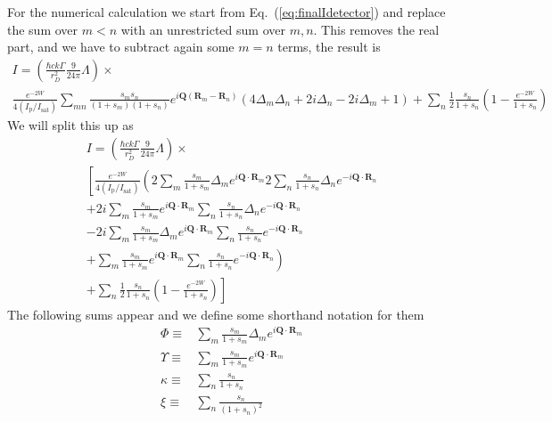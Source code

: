 \documentclass[11pt,letter]{article}
\newcommand{\bv}[1]{\ensuremath{\bm{#1}}}
\newcommand{\iisat}{\ensuremath{I_{\mathrm{p}}/I_{\mathrm{sat}}}}
\begin{document}
For the numerical calculation we start from Eq.~(\ref{eq:finalIdetector}) and replace the sum over $m<n$ with an unrestricted sum over $m,n$.  This removes the real part, and we have to subtract again some $m=n$ terms, the result is 
\begin{multline}
 I  =
 \left( 
 \frac{\hbar c k \Gamma}{r_{D}^{2}}  
     \frac{9}{24\pi} \Lambda 
  \right) \times \\
  \frac{ e^{-2W} }{ 4 (\iisat)} \sum_{mn} 
    \frac{ s_{m} s_{n} } { ( 1+s_{m} )( 1+s_{n} ) }
               e^{ i \bv{Q}( \bv{R}_{m} - \bv{R}_{n} ) }
    \left(
        4 \Delta_{m} \Delta_{n}
      + 2 i \Delta_{n} 
      - 2 i \Delta_{m}
      + 1
    \right)  
  + \sum_{n}  \frac{1}{2}
    \frac{ s_{n} } { 1 + s_{n} } \left( 1 - \frac{e^{-2W}}{1+s_{n}} \right)
\end{multline}
We will split this up as 
\begin{multline}
 I  =
 \left( 
 \frac{\hbar c k \Gamma}{r_{D}^{2}}  
     \frac{9}{24\pi} \Lambda 
  \right) \times \\
  \left[
  \frac{ e^{-2W} }{ 4 (\iisat)}
  \left( 
    2 \sum_{m}  
    \frac{ s_{m} }
         {  1 + s_{m} } \Delta_{m} e^{i\bv{Q}\cdot\bv{R}_{m} }
    2 \sum_{n} 
    \frac{ s_{n} }
         {  1 + s_{n} } \Delta_{n} e^{-i\bv{Q}\cdot\bv{R}_{n} }  \right. \right.\\
    + 2i\sum_{m}  
    \frac{ s_{m} }
         {  1 + s_{m} } e^{i\bv{Q}\cdot\bv{R}_{m} }
    \sum_{n} 
    \frac{ s_{n} }
         {  1 + s_{n} } \Delta_{n} e^{-i\bv{Q}\cdot\bv{R}_{n} }   \\
    - 2i\sum_{m}  
    \frac{ s_{m} }
         {  1 + s_{m} } \Delta_{m} e^{i\bv{Q}\cdot\bv{R}_{m} }
    \sum_{n} 
    \frac{ s_{n} }
         {  1 + s_{n} } e^{-i\bv{Q}\cdot\bv{R}_{n} }   \\
    \left.
    +\sum_{m}  
    \frac{ s_{m} }
         {  1 + s_{m} } e^{i\bv{Q}\cdot\bv{R}_{m} }
    \sum_{n} 
    \frac{ s_{n} }
         {  1 + s_{n} } e^{-i\bv{Q}\cdot\bv{R}_{n} }  \right) \\
   \left.
  + \sum_{n}  \frac{1}{2}
    \frac{ s_{n} } { 1 + s_{n} } \left( 1 - \frac{e^{-2W}}{1+s_{n}} \right) \right]
\end{multline}
The following sums appear and we define some shorthand notation for them
\begin{align} 
     \Phi \equiv & 
     \sum_{m}  
    \frac{ s_{m} }
         {  1 + s_{m} } \Delta_{m} e^{i\bv{Q}\cdot\bv{R}_{m} } \\
     \Upsilon \equiv &
     \sum_{m}  
    \frac{ s_{m} }
         {  1 + s_{m} } e^{i\bv{Q}\cdot\bv{R}_{m} } \\
     \kappa \equiv & 
     \sum_{n}  
     \frac{ s_{n} } { 1 + s_{n} }  \\
     \xi \equiv & 
     \sum_{n}  
     \frac{ s_{n} } { (1 + s_{n})^{2}}  \\
\end{align}
\end{document}

